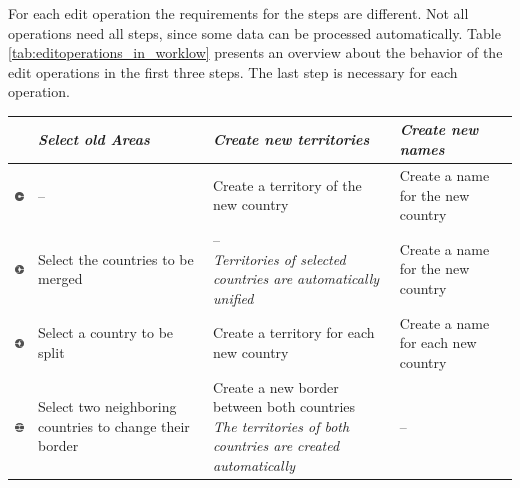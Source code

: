 For each edit operation the requirements for the steps are different. Not all operations need all steps, since some data can be processed automatically. Table \ref{tab:editoperations_in_worklow} presents an overview about the behavior of the edit operations in the first three steps. The last step is necessary for each operation.


\vspace{1em}
\begin{table}[H]
\begin{center}
\begin{tabular}{m{0.9cm} m{4.2cm} m{4.2cm} m{3.5cm}}
  \toprule

  &
  \emph{Select old Areas} &
  \emph{Create new territories} &
  \emph{Create new names} \\

  \midrule
  \raisebox{-0.35\height}
  {\includegraphics[width=0.72cm]{graphics/development/editing_hivent_data/edit_operations/CRE}} &
  -- &
  Create a territory of the new country &
  Create a name for the new country \\

  \midrule
  \raisebox{-0.35\height}
  {\includegraphics[width=0.72cm]{graphics/development/editing_hivent_data/edit_operations/MRG}} &
  Select the countries to be merged &
  \pbox{4.4cm}{--\\
  \emph{Territories of selected countries are automatically unified}} &
  Create a name for the new country
  \\

  \midrule
  \raisebox{-0.35\height}
  {\includegraphics[width=0.72cm]{graphics/development/editing_hivent_data/edit_operations/SPL}} &
  Select a country to be \mbox{split} &
  Create a territory for each new country &
  Create a name for each new country \\

  \midrule
  \raisebox{-0.35\height}
  {\includegraphics[width=0.72cm]{graphics/development/editing_hivent_data/edit_operations/CHB}} &
  Select two neighboring countries to change their border &
  \pbox{4.4cm}{Create a new border between both countries \\
  \emph{The territories of both countries are created automatically}}  &
  -- \\


\end{tabular}
\end{center}
\end{table}
